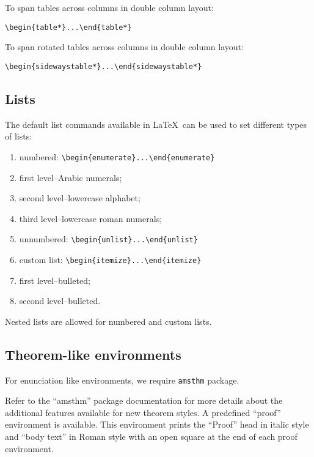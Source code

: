 \documentclass{article}
\begin{document}
To span tables across columns in double column layout:

\begin{verbatim}
\begin{table*}...\end{table*}
\end{verbatim}

To span rotated tables across columns in double column layout:

\begin{verbatim}
\begin{sidewaystable*}...\end{sidewaystable*}
\end{verbatim}

\subsection{Lists}
The default list commands available in \LaTeX\ can be used to set different types of lists:

\begin{enumerate}
\item  numbered: \verb+\begin{enumerate}...\end{enumerate}+
\item[] first level--Arabic numerals;
\item[]second level--lowercase alphabet;
\item[]third level--lowercase roman numerals;
\item  unnumbered: \verb+\begin{unlist}...\end{unlist}+
\item  custom list: \verb+\begin{itemize}...\end{itemize}+
\item[]first level--bulleted;
\item[]second level--bulleted.
\end{enumerate}
Nested lists are allowed for numbered and custom lists.

\subsection{Theorem-like environments}

For enunciation like environments, we require \verb+amsthm+ package. 

Refer to the ``amsthm'' package documentation for more details about the additional features available for new theorem styles. A predefined ``proof'' environment is available. This environment prints the ``Proof'' head in italic style and ``body text'' in Roman style with an open square at the end of each proof environment.
\end{document}
